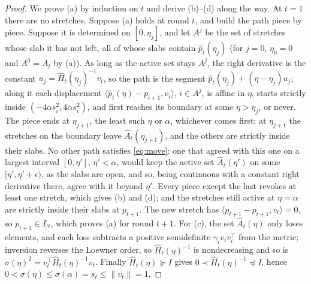 \documentclass[11pt]{article}
\theoremstyle{plain}
\theoremstyle{definition}
\theoremstyle{remark}
\newcommand{\ip}[2]{\langle #1, #2\rangle}
\begin{document}
\begin{proof}
We prove (a) by induction on $t$ and derive (b)--(d) along the way. At $t=1$ there are no stretches.
Suppose (a) holds at round $t$, and build the path piece by piece. Suppose it is determined on
$[0,\eta_j]$, and let $A^{j}$ be the set of stretches whose slab it has not left, all of whose slabs
contain $\hat p_t(\eta_j)$ (for $j=0$, $\eta_0=0$ and $A^{0}=A_t$ by (a)). As long as the active set
stays $A^{j}$, the right derivative is the constant $u_j=\hat H_t(\eta_j)^{-1}v_t$, so the path is
the segment $\hat p_t(\eta_j)+(\eta-\eta_j)u_j$; along it each displacement $\ip{\hat
p_t(\eta)-p_{i+1}}{v_i}$, $i\in A^{j}$, is affine in $\eta$, starts strictly inside $(-4\alpha
s_i^{2},4\alpha s_i^{2})$, and first reaches its boundary at some $\eta>\eta_j$, or never. The piece
ends at $\eta_{j+1}$, the least such $\eta$ or $\alpha$, whichever comes first; at $\eta_{j+1}$ the
stretches on the boundary leave $\hat A_t(\eta_{j+1})$, and the others are strictly inside their
slabs. No other path satisfies \eqref{eq:move}: one that agreed with this one on a largest interval
$[0,\eta']$, $\eta'<\alpha$, would keep the active set $\hat A_t(\eta')$ on some
$[\eta',\eta'+\epsilon)$, as the slabs are open, and so, being continuous with a constant right
derivative there, agree with it beyond $\eta'$. Every piece except the last revokes at least one
stretch, which gives (b) and (d); and the stretches still active at $\eta=\alpha$ are strictly
inside their slabs at $p_{t+1}$. The new stretch has $\ip{p_{t+1}-p_{t+1}}{v_t}=0$, so
$p_{t+1}\in L_t$, which proves (a) for round $t+1$. For (c), the set $\hat A_t(\eta)$ only loses
elements, and each loss subtracts a positive semidefinite $\gamma_iv_iv_i^{\top}$ from the metric;
inversion reverses the Loewner order, so $\hat H_t(\eta)^{-1}$ is nondecreasing and so is
$\sigma(\eta)^{2}=v_t^{\top}\hat H_t(\eta)^{-1}v_t$. Finally $\hat H_t(\eta)\succeq I$ gives
$0\prec\hat H_t(\eta)^{-1}\preceq I$, hence
$0<\sigma(\eta)\le\sigma(\alpha)=s_t\le\|v_t\|=1$.
\end{proof}
\end{document}

